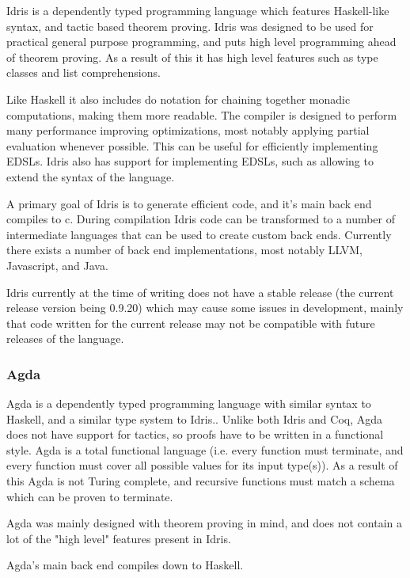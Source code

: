 Idris\cite{idris} is a dependently typed programming language which features Haskell-like syntax, and tactic
based theorem proving. Idris was designed to be used for practical general purpose programming, and puts high level
programming ahead of theorem proving. As a result of this it has high level features such as type classes and list 
comprehensions. 

Like Haskell it also includes do notation for chaining together monadic computations, making them more readable. 
The compiler is designed to perform many performance improving
optimizations, most notably applying partial evaluation whenever possible. This can be useful for efficiently implementing
EDSLs\cite{edslidris}. Idris also has support for implementing EDSLs\cite{edslidris2}, such as allowing to extend the syntax of the language.   

A primary goal of Idris is to generate efficient code, and it's main back end compiles to c. During compilation
Idris code can be transformed to a number of intermediate languages that can be used to create custom back ends. 
Currently there exists a number of back end implementations, most notably LLVM, Javascript, and Java.

Idris currently at the time of writing does not have a stable release (the current release version being 0.9.20) which
may cause some issues in development, mainly that code written for the current release may not be compatible with future 
releases of the language.


\subsubsection{Agda}

Agda\cite{agda} is a dependently typed programming language with similar syntax to Haskell, and a similar
type system to Idris..
Unlike both Idris and Coq, Agda does not have support for tactics, so proofs have to be written
in a functional style. Agda is a total functional language\cite{total} (i.e. every function must terminate, and every function
must cover all possible values for its input type(s)). As a result of this Agda is not Turing complete, and
recursive functions must match a schema which can be proven to terminate.  

Agda was mainly designed with theorem proving in mind, and does not contain a lot of the "high level" 
features present in Idris.

Agda's main back end compiles down to Haskell.


